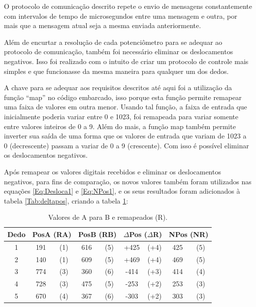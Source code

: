 \documentclass[
	12pt,				%
	openright,			%
	oneside,			%
	a4paper,			%
	english,			%
	brazil				%
	]{abntex2}
\begin{document}
		O protocolo de comunicação descrito repete o envio de mensagens constantemente com intervalos de tempo de microsegundos entre uma mensagem e outra, por mais que a mensagem atual seja a mesma enviada anteriormente.   
		
		Além de encurtar a resolução de cada potenciômetro para se adequar ao protocolo de comunicação, também foi necessário eliminar os deslocamentos negativos. Isso foi realizado com o intuito de criar um protocolo de controle mais simples e que funcionasse da mesma maneira para qualquer um dos dedos.

	 A chave para se adequar aos requisitos descritos até aqui foi a utilização da função ``map'' no código embarcado, isso porque esta função permite remapear uma faixa de valores em outra menor. Usando tal função, a faixa de entrada que inicialmente poderia variar entre 0 e 1023, foi remapeada para variar somente entre valores inteiros de 0 a 9. Além do mais, a função map também permite inverter sua saída de uma forma que os valores de entrada que variam de 1023 a 0 (decrescente) passam a variar de 0 a 9 (crescente). Com isso é possível eliminar os deslocamentos negativos.

	 Após remapear os valores digitais recebidos e eliminar os deslocamentos negativos, para fins de comparação, os novos valores também foram utilizados nas equações \ref{Eq:Desloca1} e \ref{Eq:NPos1}, e os seus resultados foram adicionados à tabela \ref{Tab:deltapos}, criando a tabela \ref{Tab:deltaremap}:


	\begin{table}[H]
  	\centering
		\caption{Valores de A para B e remapeados (R).}
    \begin{tabular}{c|cc|cc|cc|cc}
      \midrule
			Dedo	&\multicolumn{2}{c}{PosA	(RA)} 	&\multicolumn{2}{c}{PosB (RB)}	&\multicolumn{2}{c}{$\Delta$Pos	($\Delta$R)}	&\multicolumn{2}{c}{NPos	(NR)}	\\
      \midrule
			1 		& 191 & (1)		& 616 & (5)		& 		+425 & (+4)		&			425	& (5)		\\
			2 		& 140 & (1)		& 609 & (5)		& 		+469 & (+4)		&			469 &	(5)		\\
			3 		& 774 & (3)		& 360 & (6)		& 		-414 & (+3)		&			414	& (4)		\\
			4 		& 728 & (3)		& 475 & (5)		& 		-253 & (+2)		&			253	& (3)		\\
			5 		& 670 & (4)		& 367 & (6)		& 		-303 & (+2)		&			303 &	(3)		\\      
      \midrule
    \end{tabular}
    \label{Tab:deltaremap}
	\end{table}
	
\end{document}
